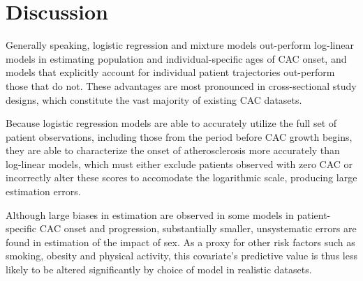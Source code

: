 \documentclass[aps,pre,twocolumn,twoside,tightenlines,groupedaddress,amsmath,amssymb,nobibnotes,final,showkeys,letterpaper]{revtex4-2}
\begin{document}
\begin{table*}
  \centering
  \begin{tabular}{llrrrrrrrrrrrr}
    \toprule
    
    \bottomrule
  \end{tabular}
  \caption{Estimation bias (mean and standard error) over all \numStudies{} studies, in years. Statistical models that include individual-specific trajectories (subscript $i$) calculate bias estimates using the true $t_{0i}$ and $d_i$ values of each patient; models without individual-specific trajectories estimate population-level parameters, which are compared against the true population average $t_0$ and $d$ within each simulated study. Biases on ``sex'' represent the estimated average difference between men and women minus the true generative difference (or lack thereof). Since $\mathrm{E}(t_{0i}) = \ell_i$, logistic regression models use $\ell_i$ or $\ell$ as equivalents to $t_{0i}$ and $t_0$. Estimates in boldface are statistically distinct from zero bias by two-tailed $t$-tests with $\alpha = 0.001$.}
  \label{tab:modelBiasMeans}
\end{table*}

\section{Discussion}

Generally speaking, logistic regression and mixture models out-perform log-linear models in estimating population and individual-specific ages of CAC onset, and models that explicitly account for individual patient trajectories out-perform those that do not. These advantages are most pronounced in cross-sectional study designs, which constitute the vast majority of existing CAC datasets.

Because logistic regression models are able to accurately utilize the full set of patient observations, including those from the period before CAC growth begins, they are able to characterize the onset of atherosclerosis more accurately than log-linear models, which must either exclude patients observed with zero CAC or incorrectly alter these scores to accomodate the logarithmic scale, producing large estimation errors.

Although large biases in estimation are observed in some models in patient-specific CAC onset and progression, substantially smaller, unsystematic errors are found in estimation of the impact of sex. As a proxy for other risk factors such as smoking, obesity and physical activity, this covariate's predictive value is thus less likely to be altered significantly by choice of model in realistic datasets.
\end{document}
